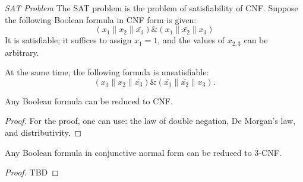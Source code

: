 \begin{example}
\emph{SAT Problem}
\label{exAddAlgoSAT}
The SAT problem is the problem of satisfiability of CNF. Suppose the following
Boolean formula in CNF form is given:
\begin{equation}
\left(x_1 \| x_2 \| \bar{x_3} \right) \& \left(x_1 \| \bar{x_2} \| x_3 \right)
\nonumber
\end{equation}
It is satisfiable; it suffices to assign $x_1 = 1$, and the values of
$x_{2,3}$ can be arbitrary.

At the same time, the following formula is unsatisfiable:
\begin{equation}
\left(x_1 \| x_2 \| \bar{x_3} \right) \& 
\left(\bar{x_1} \| \bar{x_2} \| x_3 \right).
\nonumber
\end{equation}

\end{example}

\begin{theorem}
Any Boolean formula can be reduced to CNF. 
\end{theorem}

\begin{proof}
For the proof, one can use: the law of double negation, De Morgan's law,
and distributivity.
\end{proof}

\begin{theorem}
Any Boolean formula in conjunctive normal form can be
reduced to 3-CNF.  
\end{theorem}

\begin{proof}
TBD
\end{proof}